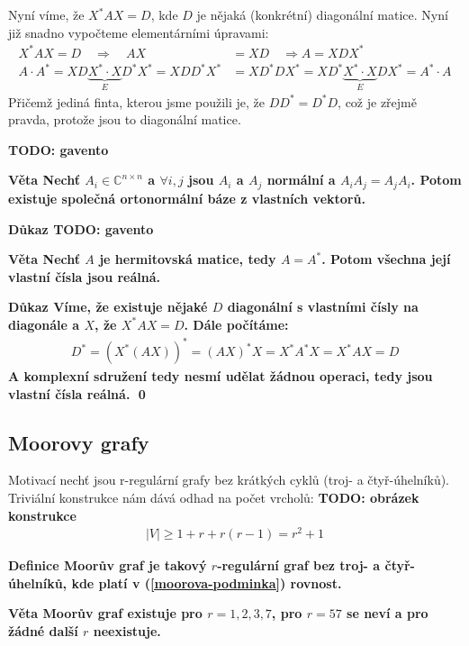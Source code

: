 \documentclass[a4paper,12pt,titlepage]{article}
\newcommand{\dk}{\smallskip\noindent\bf Důkaz\rm{} }
\newcommand{\df}{\smallskip\noindent\bf Definice\rm{} }
\newcommand{\vt}{\smallskip\noindent\bf Věta\rm{} }
\newcommand{\C}{\mathbb{C}}
\newcommand{\todo}[1]{\bf TODO: \rm#1}
\begin{document}
\begin{description}
	Nyní víme, že $X^*AX=D$, kde $D$ je nějaká (konkrétní) diagonální matice. Nyní již snadno vypočteme elementárními úpravami:
	\begin{align*}
		X^* A X = D \quad \Rightarrow \quad AX &= XD \quad \Rightarrow A = XDX^* \\
		A\cdot A^* = XD\underbrace{X^*\cdot X}_ED^*X^* = XDD^*X^*
		&= XD^*DX^* = XD^*\underbrace{X^*\cdot X}_EDX^* = A^*\cdot A
	\end{align*}
	Přičemž jediná finta, kterou jsme použili je, že $DD^* = D^*D$, což je zřejmě pravda, protože jsou to diagonální matice.

	\item \uv{$\Leftarrow$} \todo{gavento}
\end{description}

\vt Nechť $A_i \in \C^{n\times n}$ a $\forall i,j$ jsou $A_i$ a $A_j$ normální a $A_iA_j = A_j A_i$. Potom existuje společná ortonormální báze z vlastních vektorů.

\dk \todo{gavento}

\vt Nechť $A$ je hermitovská matice, tedy $A = A^*$. Potom všechna její vlastní čísla jsou reálná.

\dk Víme, že existuje nějaké $D$ diagonální s vlastními čísly na diagonále a $X$, že $X^*AX = D$. Dále počítáme:
\begin{align}
	D^* = (X^*(AX))^* = (AX)^*X = X^*A^*X = X^*AX = D
\end{align}
A komplexní sdružení tedy nesmí udělat žádnou operaci, tedy jsou vlastní čísla reálná. \qed


\subsection{Moorovy grafy}
Motivací nechť jsou r-regulární grafy bez krátkých cyklů (troj- a 
čtyř-úhelníků). Triviální konstrukce nám dává odhad na počet vrcholů:
\todo{obrázek konstrukce}
\begin{align}
\label{moorova-podminka}
	|V| \geq 1 + r + r(r-1) = r^2 +1
\end{align}

\df Moorův graf je takový $r$-regulární graf bez troj- a čtyř-úhelníků, kde 
platí v (\ref{moorova-podminka}) rovnost.

\vt Moorův graf existuje pro $r=1,2,3,7$, pro $r=57$ se neví a pro žádné další 
$r$ neexistuje.
\end{document}
